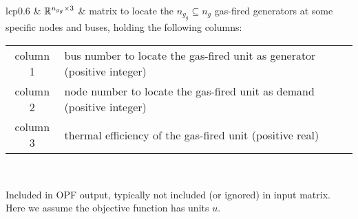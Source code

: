 \begin{appendix}
\begin{table}[!ht]
\begin{threeparttable}
\begin{tabular}{lcp{}}
			 & $\mathbb{R}^{n_{g_g}\times 3}$	& matrix to locate the $n_{g_g} \subseteq n_g$ gas-fired generators at some specific nodes and buses, holding the following columns:
			\begin{tabular}{c @{ -- } p{}}
				column 1  & bus number to locate the gas-fired unit as generator (positive integer)\\
				column 2  & node number to locate the gas-fired unit as demand (positive integer)\\
				column 3  & thermal efficiency of the gas-fired unit (positive real)\\
			\end{tabular}\\
			
			\bottomrule
		\end{tabular}
		\begin{tablenotes}
			\scriptsize
			\item [\dag] {Included in OPF output, typically not included (or ignored) in input matrix. Here we assume the objective function has units $u$.}
		\end{tablenotes}
	\end{threeparttable}
\end{table}


\end{appendix}
